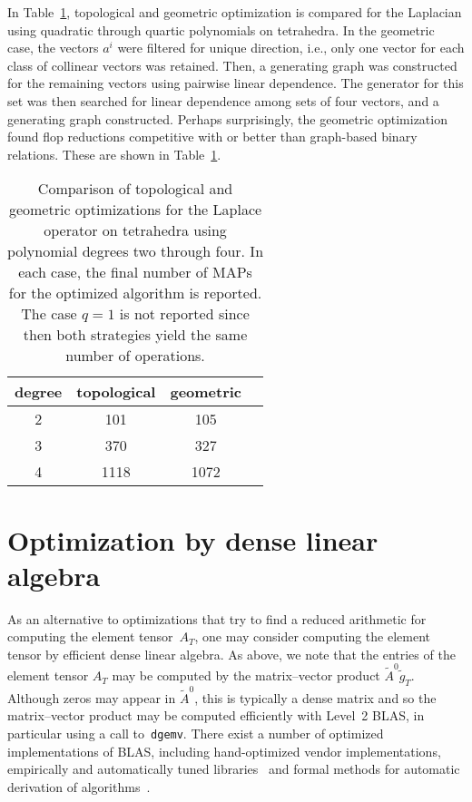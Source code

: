 In Table~\ref{tab:kirby-4:geom}, topological and geometric
optimization is compared for the Laplacian using quadratic through
quartic polynomials on tetrahedra.  In the geometric case, the vectors
$a^i$ were filtered for unique direction, i.e., only one vector for
each class of collinear vectors was retained. Then, a generating graph
was constructed for the remaining vectors using pairwise linear
dependence. The generator for this set was then searched for linear
dependence among sets of four vectors, and a generating graph
constructed.  Perhaps surprisingly, the geometric optimization found
flop reductions competitive with or better than graph-based binary
relations. These are shown in Table~\ref{tab:kirby-4:geom}.

\begin{table}
  \begin{center}
    \vspace{2em}
    \begin{tabular}{|c|c|c|c|}
      \hline
      degree & topological & geometric \\
      \hline
      \hline
      2 & 101  & 105   \\
      \hline
      3 & 370  & 327   \\
      \hline
      4 & 1118 & 1072  \\
      \hline
    \end{tabular}
    \vspace{2em}
    \caption{Comparison of topological and geometric optimizations
      for the Laplace operator on tetrahedra using polynomial degrees two
      through four. In each case, the final number of MAPs for the
      optimized algorithm is reported. The case $q=1$ is not reported
      since then both strategies yield the same number of operations.}
  \end{center}
  \label{tab:kirby-4:geom}
\end{table}

\section{Optimization by dense linear algebra}

As an alternative to optimizations that try to find a reduced
arithmetic for computing the element tensor~$A_T$, one may consider
computing the element tensor by efficient dense linear algebra.  As
above, we note that the entries of the element tensor $A_T$ may be
computed by the matrix--vector product $\tilde{A}^0
\tilde{g}_T$. Although zeros may appear in $\tilde{A}^0$, this is
typically a dense matrix and so the matrix--vector product may be
computed efficiently with Level~2 BLAS, in particular using a call
to~\texttt{dgemv}. There exist a number of optimized implementations
of BLAS, including hand-optimized vendor implementations, empirically
and automatically tuned libraries~\cite{WhaleyPetitetDongarra2001} and
formal methods for automatic derivation of
algorithms~\cite{BientinesiGunnelsMyersEtAl2005}.

